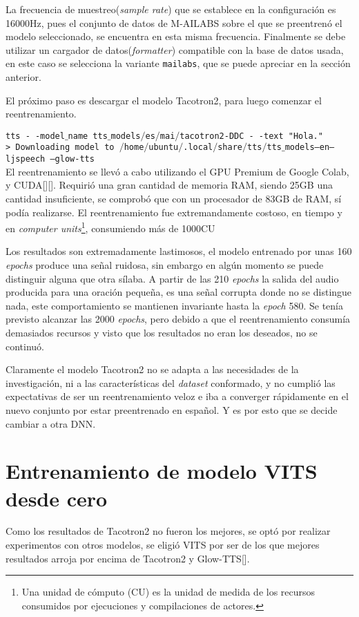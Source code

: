 La frecuencia de muestreo(\textit{sample rate}) que se establece en la configuración es 16000Hz, pues el conjunto de datos de M-AILABS sobre el que se preentrenó el modelo seleccionado, se encuentra en esta misma frecuencia. Finalmente se debe utilizar un cargador de datos(\textit{formatter}) compatible con la base de datos usada, en este caso se selecciona la variante \texttt{mailabs}, que se puede apreciar en la sección anterior.

El próximo paso es descargar el modelo Tacotron2, para luego comenzar el reentrenamiento.

\texttt{tts - -model$\_$name tts$\_$models$/$es$/$mai$/$tacotron2-DDC - -text "Hola."}\\

\texttt{> Downloading model to $/$home$/$ubuntu$/$.local$/$share$/$tts$/$tts$\_$models--en--ljspeech
	--glow-tts}\\

El reentrenamiento se llevó a cabo utilizando el GPU Premium de Google Colab, y CUDA[\cite{cuda}][\cite{cuda1}]. Requirió una gran cantidad de memoria RAM, siendo 25GB una cantidad insuficiente, se comprobó que con un procesador de 83GB de RAM, sí podía realizarse. El reentrenamiento fue extremandamente costoso, en tiempo y en \textit{computer units}\footnote{Una unidad de cómputo (CU) es la unidad de medida de los recursos consumidos por ejecuciones y compilaciones de actores.}, consumiendo más de 1000CU

Los resultados son extremadamente lastimosos, el modelo entrenado por unas 160 \textit{epochs} produce una señal ruidosa, sin embargo en algún momento se puede distinguir alguna que otra sílaba. A partir de las 210 \textit{epochs} la salida del audio producida para una oración pequeña, es una señal corrupta donde no se distingue nada, este comportamiento se mantienen invariante hasta la \textit{epoch} 580. Se tenía previsto alcanzar las 2000 \textit{epochs}, pero debido a que el reentrenamiento consumía demasiados recursos y visto que los resultados no eran los deseados, no se continuó. 

Claramente el modelo Tacotron2 no se adapta a las necesidades de la investigación, ni a las características del \textit{dataset} conformado, y no cumplió las expectativas de ser un reentrenamiento veloz e iba a converger rápidamente en el nuevo conjunto por estar preentrenado en español. Y es por esto que se decide cambiar a otra DNN.


\section{Entrenamiento de modelo VITS desde cero}
Como los resultados de Tacotron2 no fueron los mejores, se optó por realizar experimentos con otros modelos, se eligió VITS por ser de los que mejores resultados arroja por encima de Tacotron2 y Glow-TTS[\cite{kim2021conditional}].

